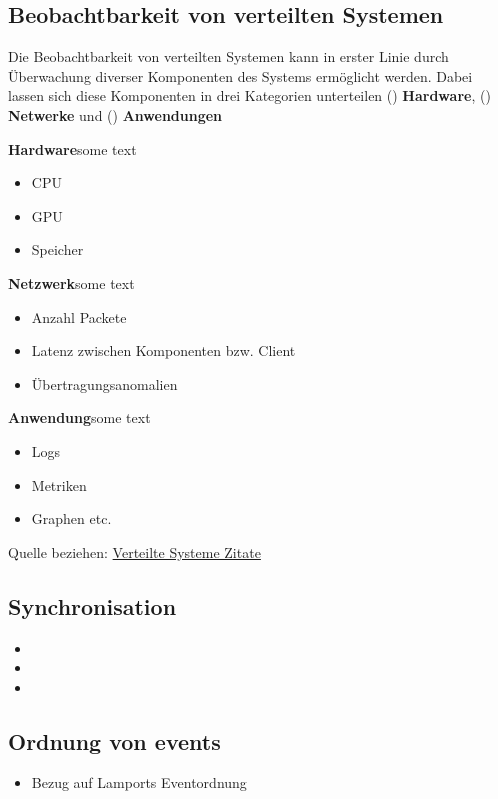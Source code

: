 \subsection{Beobachtbarkeit von verteilten Systemen}
	Die Beobachtbarkeit von verteilten Systemen kann in erster Linie durch Überwachung diverser Komponenten des Systems ermöglicht werden. Dabei lassen sich diese Komponenten in drei Kategorien unterteilen () \textbf{Hardware}, () \textbf{Netwerke} und () \textbf{Anwendungen}

	
	\textbf{Hardware}\space\space\space some text
	
	\begin{itemize}
		\item CPU
		\item GPU
		\item Speicher
	\end{itemize}
	
	\textbf{Netzwerk}\space\space\space some text
	
	\begin{itemize}
		\item Anzahl Packete
		\item Latenz zwischen Komponenten bzw. Client
		\item Übertragungsanomalien
	\end{itemize}
	
	\textbf{Anwendung}\space\space\space some text
	
	\begin{itemize}
		\item Logs
		\item Metriken
		\item Graphen etc. 
	\end{itemize}

Quelle beziehen:
\href{https://de.wikipedia.org/wiki/Verteiltes_System}{Verteilte Systeme Zitate}
\subsection{Synchronisation}
\begin{itemize}
	\item 
	\item 
	\item
\end{itemize}
\subsection{Ordnung von events}
\begin{itemize}
	\item Bezug auf Lamports Eventordnung
\end{itemize}
